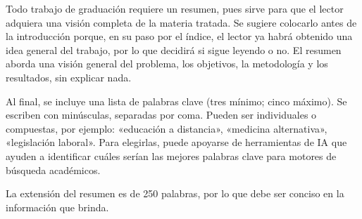 Todo trabajo de graduación requiere un resumen, pues sirve para que el lector adquiera una visión completa de la materia tratada. Se sugiere colocarlo antes de la introducción porque, en su paso por el índice, el lector ya habrá obtenido una idea general del trabajo, por lo que decidirá si sigue leyendo o no. El resumen aborda una visión general del problema, los objetivos, la metodología y los resultados, sin explicar nada.  

Al final, se incluye una lista de palabras clave (tres mínimo; cinco máximo). Se escriben con minúsculas, separadas por coma. Pueden ser individuales o compuestas, por ejemplo: «educación a distancia», «medicina alternativa», «legislación laboral». Para elegirlas, puede apoyarse de herramientas de IA que ayuden a identificar cuáles serían las mejores palabras clave para motores de búsqueda académicos.

La extensión del resumen es de 250 palabras, por lo que debe ser conciso en la información que brinda.

